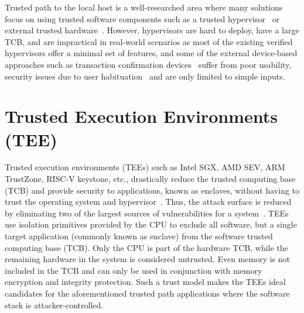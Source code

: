 Trusted path to the local host is a well-researched area where many solutions focus on using trusted software components such as a trusted hypervisor~\cite{zhou2012building} or external trusted hardware~\cite{filyanov2011uni,weigold2011secure,McCPerRei2006,mannan2007using,Fidelius}. However, hypervisors are hard to deploy, have a large TCB, and are impractical in real-world scenarios as most of the existing verified hypervisors offer a minimal set of features, and some of the external device-based approaches such as transaction confirmation devices~\cite{filyanov2011uni,weigold2011secure} suffer from poor usability, security issues due to user habituation~\cite{anderson2016warning} and are only limited to simple inputs.


\section{Trusted Execution Environments (TEE)}

Trusted execution environments (TEEs) such as Intel SGX, AMD SEV, ARM TrustZone, RISC-V keystone, etc., drastically reduce the trusted computing base (TCB) and provide security to applications, known as enclaves, without having to trust the operating system and hypervisor~\cite{costan2016intel,winter2008trusted,costan2016sanctum}. Thus, the attack surface is reduced by eliminating two of the largest sources of vulnerabilities for a system~\cite{checkoway2013iago,suzaki2011memory}. TEEs use isolation primitives provided by the CPU to exclude all software, but a single target application (commonly known as enclave) from the software trusted computing base (TCB). Only the CPU is part of the hardware TCB, while the remaining hardware in the system is considered untrusted. Even memory is not included in the TCB and can only be used in conjunction with memory encryption and integrity protection. Such a trust model makes the TEEs ideal candidates for the aforementioned trusted path applications where the software stack is attacker-controlled. 

